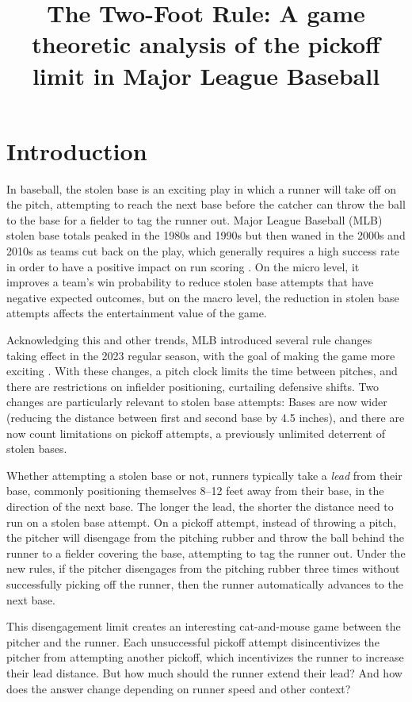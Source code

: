 \documentclass{article}
\title{The Two-Foot Rule: A game theoretic analysis of the pickoff limit in Major League Baseball}
\begin{document}
  \maketitle

  \section{Introduction}

    In baseball, the stolen base is an exciting play in which a runner will take off on the pitch, attempting to reach the next base before the catcher can throw the ball to the base for a fielder to tag the runner out. Major League Baseball (MLB) stolen base totals peaked in the 1980s and 1990s but then waned in the 2000s and 2010s as teams cut back on the play, which generally requires a high success rate in order to have a positive impact on run scoring \citep{tango_book_2007}. On the micro level, it improves a team's win probability to reduce stolen base attempts that have negative expected outcomes, but on the macro level, the reduction in stolen base attempts affects the entertainment value of the game.

    Acknowledging this and other trends, MLB introduced several rule changes taking effect in the 2023 regular season, with the goal of making the game more exciting \citep{castrovince_pitch_2023}. With these changes, a pitch clock limits the time between pitches, and there are restrictions on infielder positioning, curtailing defensive shifts. Two changes are particularly relevant to stolen base attempts: Bases are now wider (reducing the distance between first and second base by 4.5 inches), and there are now count limitations on pickoff attempts, a previously unlimited deterrent of stolen bases.
    
    Whether attempting a stolen base or not, runners typically take a {\it lead} from their base, commonly positioning themselves 8--12 feet away from their base, in the direction of the next base. The longer the lead, the shorter the distance need to run on a stolen base attempt. On a pickoff attempt, instead of throwing a pitch, the pitcher will disengage from the pitching rubber and throw the ball behind the runner to a fielder covering the base, attempting to tag the runner out. Under the new rules, if the pitcher disengages from the pitching rubber three times without successfully picking off the runner, then the runner automatically advances to the next base.

    This disengagement limit creates an interesting cat-and-mouse game between the pitcher and the runner. Each unsuccessful pickoff attempt disincentivizes the pitcher from attempting another pickoff, which incentivizes the runner to increase their lead distance. But how much should the runner extend their lead? And how does the answer change depending on runner speed and other context?
    
\end{document}
